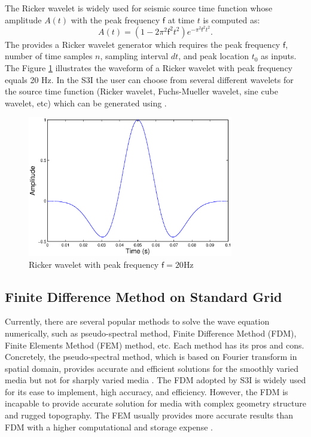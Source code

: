 \documentclass[11pt,titlepage]{article}
\newcommand{\sff}{\mathsf{f}}
\theoremstyle{plain}
\theoremstyle{definition}
\theoremstyle{remark}
\numberwithin{equation}{section}
\begin{document}
The Ricker wavelet is widely used for seismic source time function whose amplitude $A(t)$ with the peak frequency $\sff$ at time $t$ is computed as:
\begin{equation}
A(t)=(1-2\pi^2 \sff^2 t^2)e^{-\pi^2 \sff^2 t^2}.
\end{equation}
The  provides a Ricker wavelet generator which requires the peak frequency $\sff$, number of time samples $n$, sampling interval $dt$, and peak location $t_0$ as inputs. The Figure \ref{fig:ricker} illustrates the waveform of a Ricker wavelet with peak frequency equals 20 Hz. In the S3I the user can choose from several different wavelets for the source time function (Ricker wavelet, Fuchs-Mueller wavelet, sine cube wavelet, etc) which can be generated using .

\begin{figure}[htbp]
\centering
\includegraphics[width=0.8\textwidth]{Fig/ricker}
\caption{Ricker wavelet with peak frequency $\sff=20$Hz}
\label{fig:ricker}
\end{figure}


\subsection{Finite Difference Method on Standard Grid}
Currently, there are several popular methods to solve the wave equation numerically, such as pseudo-spectral method, Finite Difference Method (FDM), Finite Elements Method (FEM) method, etc. Each method has its pros and cons. Concretely, the pseudo-spectral method, which is based on Fourier transform in spatial domain, provides accurate and efficient solutions for the smoothly varied media but not for sharply varied media \cite{Kreiss:1972aa,Fornberg:1975aa,Fornberg:1987aa}. The FDM \cite{Alford:1974aa,Dablain:1986aa} adopted by S3I is widely used for its ease to implement, high accuracy, and efficiency. However, the FDM is incapable to provide accurate solution for media with complex geometry structure and rugged topography. The FEM usually provides more accurate results than FDM with a higher computational and storage expense \cite{Kurt:1984aa}. 
\end{document}
